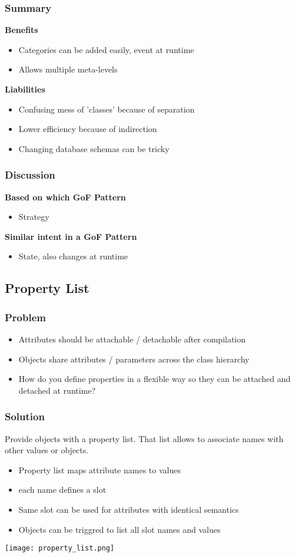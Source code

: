 \subsubsection{Summary}
\textbf{Benefits}
\begin{itemize}
    \item Categories can be added easily, event at runtime
    \item Allows multiple meta-levels
\end{itemize}
\textbf{Liabilities}
\begin{itemize}
    \item Confusing mess of 'classes' because of separation
    \item Lower efficiency because of indirection
    \item Changing database schemas can be tricky
\end{itemize}
\subsubsection{Discussion}
\textbf{Based on which GoF Pattern}
\begin{itemize}
    \item Strategy
\end{itemize}
\textbf{Similar intent in a GoF Pattern}
\begin{itemize}
    \item State, also changes at runtime
\end{itemize}

\subsection{Property List}
\subsubsection{Problem}
\begin{itemize}
    \item Attributes should be attachable / detachable after compilation
    \item Objects share attributes / parameters across the class hierarchy
    \item How do you define properties in a flexible way so they can be attached and detached at runtime?
\end{itemize}
\subsubsection{Solution}
Provide objects with a property list. That list allows to associate names with other values or objects.
\begin{itemize}
    \item Property list maps attribute names to values
    \item each name defines a slot
    \item Same slot can be used for attributes with identical semantics
    \item Objects can be triggred to list all slot names and values
\end{itemize}
\texttt{[image: property\_list.png]}
